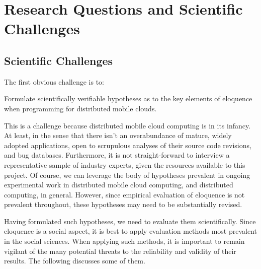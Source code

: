 \section{Research Questions and Scientific Challenges}

\subsection{Scientific Challenges}

\label{sec:scientific-challenges}

The first obvious challenge is to:

\begin{scientific-challenge} \label{challenge:hypotheses}

Formulate scientifically verifiable hypotheses as to the key elements
of eloquence when programming for distributed mobile clouds.

\end{scientific-challenge}

This is a challenge because distributed mobile cloud computing is in
its infancy. At least, in the sense that there isn't an overabundance
of mature, widely adopted applications, open to scrupulous analyses of
their source code revisions, and bug databases. Furthermore, it is not
straight-forward to interview a representative sample of industry
experts, given the resources available to this project. Of course, we
can leverage the body of hypotheses prevalent in ongoing experimental
work in distributed mobile cloud computing, and distributed computing,
in general. However, since empirical evaluation of eloquence is not
prevalent throughout, these hypotheses may need to be substantially
revised.

\bigskip

Having formulated such hypotheses, we need to evaluate them
scientifically. Since eloquence is a social aspect, it is best to
apply evaluation methods most prevalent in the social sciences. When
applying such methods, it is important to remain vigilant of the many
potential threats to the reliability and validity of their
results\cite{2011-Validity-and-reliability-in-social-research}. The
following discusses some of them.




